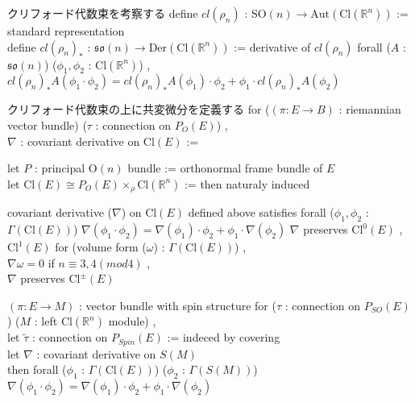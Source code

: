 \begin{Definition}
\itemnote
  クリフォード代数束を考察する
\itemdefi
  define \(cl(\rho_n)\) : \(\text{SO}(n) \to \text{Aut}(\text{Cl}(\mathbb{R}^n))\) := standard representation \\
  define \(cl(\rho_n)_*\) : \(\mathfrak{so}(n) \to \text{Der}(\text{Cl}(\mathbb{R}^n))\) := derivative of \(cl(\rho_n)\)
\itemprop
  forall (\(A\) : \(\mathfrak{so}(n)\)) (\(\phi_1 , \phi_2\) : \(\text{Cl}(\mathbb{R}^n)\)) , \({cl(\rho_n)_* A}(\phi_1 \cdot \phi_2) = {cl(\rho_n)_* A}(\phi_1) \cdot \phi_2 + \phi_1 \cdot {cl(\rho_n)_* A}(\phi_2)\)
\end{Definition}

\begin{Definition}
\itemnote
  クリフォード代数束の上に共変微分を定義する
\itemdefi
  for (\((\pi : E \to B)\) : riemannian vector bundle) (\(\tau\) : connection on \(P_{O}(E)\)) ,\\
  \(\nabla\) : covariant derivative on \(\text{Cl}(E)\) := 
  \begin{indentblock}
    let \(P\) : principal \(\text{O}(n)\) bundle := orthonormal frame bundle of \(E\) \\
    let \(\text{Cl}(E) \cong P_{O}(E) \times_{\rho} \text{Cl}(\mathbb{R}^n)\) := 
    then naturaly induced
  \end{indentblock}
\end{Definition}

\begin{Theorem}
\itemprop
  covariant derivative (\(\nabla\)) on \(\text{Cl}(E)\) defined above satisfies forall (\(\phi_1 , \phi_2\) : \(\Gamma(\text{Cl}(E))\)) \(\nabla(\phi_1 \cdot \phi_2) = \nabla(\phi_1) \cdot \phi_2 + \phi_1 \cdot \nabla(\phi_2)\)
\itemprop
  \(\nabla\) preserves \(\text{Cl}^0(E)\) , \(\text{Cl}^1(E)\)
\itemprop
  for (volume form (\(\omega\)) : \(\Gamma(\text{Cl}(E))\)) ,\\
  \(\nabla \omega = 0\)
\itemprop
  if \(n \equiv 3 , 4(mod 4)\) ,\\
  \(\nabla\) preserves \(\text{Cl}^{\pm}(E)\)
\end{Theorem}

\begin{Definition}
\itemwhen \((\pi : E \to M)\) : vector bundle with spin structure
\itemdefi
  for (\(\tau\) : connection on \(P_{SO}(E)\)) (\(M\) : left \(\text{Cl}(\mathbb{R}^n)\) module) ,\\
  let \(\tilde{\tau}\) : connection on \(P_{Spin}(E)\) := indeced by covering \\
  let \(\nabla\) : covariant derivative on \(S(M)\) \\
  then forall (\(\phi_1\) : \(\Gamma(\text{Cl}(E))\)) (\(\phi_2\) : \(\Gamma(S(M))\)) \(\nabla(\phi_1 \cdot \phi_2) = \nabla(\phi_1) \cdot \phi_2 + \phi_1 \cdot \nabla(\phi_2)\)
\end{Definition}